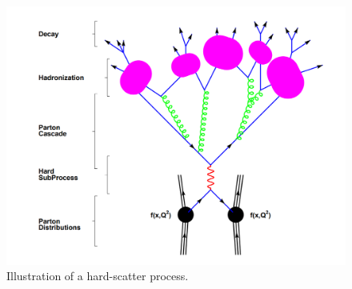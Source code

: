 \begin{figure}
\centering
\includegraphics[width=0.6\linewidth]{plots/SM/evtgenerator.PNG}
\caption{Illustration of a hard-scatter process. \protect\cite{Dobbs:2001ck}}
\label{fig:sm:evtgen}
\end{figure}